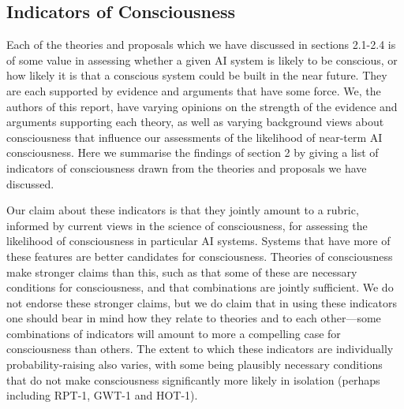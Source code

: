 \documentclass[12pt]{article}
\begin{document}
\subsection{Indicators of Consciousness}

Each of the theories and proposals which we have discussed in sections 2.1-2.4 is of some value in assessing whether a given AI system is likely to be conscious, or how likely it is that a conscious system could be built in the near future. They are each supported by evidence and arguments that have some force. We, the authors of this report, have varying opinions on the strength of the evidence and arguments supporting each theory, as well as varying background views about consciousness that influence our assessments of the likelihood of near-term AI consciousness. Here we summarise the findings of section 2 by giving a list of indicators of consciousness drawn from the theories and proposals we have discussed.

Our claim about these indicators is that they jointly amount to a rubric, informed by current views in the science of consciousness, for assessing the likelihood of consciousness in particular AI systems. Systems that have more of these features are better candidates for consciousness. Theories of consciousness make stronger claims than this, such as that some of these are necessary conditions for consciousness, and that combinations are jointly sufficient. We do not endorse these stronger claims, but we do claim that in using these indicators one should bear in mind how they relate to theories and to each other—some combinations of indicators will amount to more a compelling case for consciousness than others. The extent to which these indicators are individually probability-raising also varies, with some being plausibly necessary conditions that do not make consciousness significantly more likely in isolation (perhaps including RPT-1, GWT-1 and HOT-1).

\newpage



\end{document}
